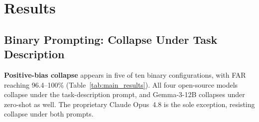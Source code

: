 \documentclass[journal]{IEEEtran}
\begin{document}
\section{Results}
\label{sec:results}

\subsection{Binary Prompting: Collapse Under Task Description}

\textbf{Positive-bias collapse} appears in five of ten binary
configurations, with FAR reaching 96.4--100\%
(Table~\ref{tab:main_results}). All four open-source models collapse under
the task-description prompt, and Gemma-3-12B collapses under zero-shot as
well. The proprietary Claude Opus~4.8 is the sole exception, resisting
collapse under both prompts.
\end{document}

